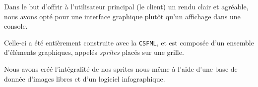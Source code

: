 Dans le but d'offrir à l'utilisateur principal (le client) un rendu clair et agréable, nous avons opté pour une interface graphique plutôt qu'un affichage dans une console.

Celle-ci a été entièrement construite avec la \texttt{CSFML}, et est composée d'un ensemble d'éléments graphiques, appelés \textit{sprites} placés sur une grille.

Nous avons créé l'intégralité de nos sprites nous même à l'aide d'une base de donnée d'images libres et d'un logiciel infographique. \\

\\


